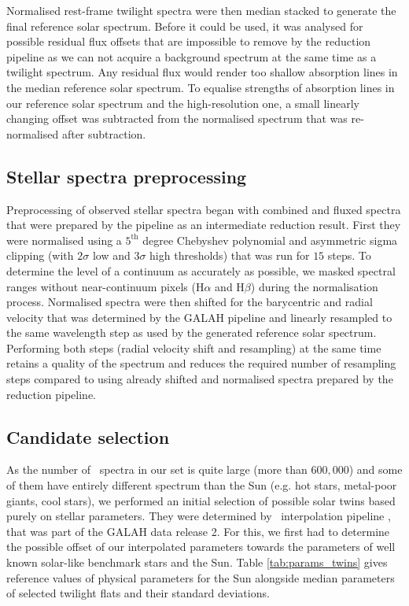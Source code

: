 Normalised rest-frame twilight spectra were then median stacked to generate the final reference solar spectrum. Before it could be used, it was analysed for possible residual flux offsets that are impossible to remove by the reduction pipeline as we can not acquire a background spectrum at the same time as a twilight spectrum. Any residual flux would render too shallow absorption lines in the median reference solar spectrum. To equalise strengths of absorption lines in our reference solar spectrum and the high-resolution one, a small linearly changing offset was subtracted from the normalised spectrum that was re-normalised after subtraction. 

\subsection{Stellar spectra preprocessing}
\label{sec:05_preprocessing}
Preprocessing of observed stellar spectra began with combined and fluxed spectra that were prepared by the pipeline as an intermediate reduction result. First they were normalised using a $5^\text{th}$ degree Chebyshev polynomial and asymmetric sigma clipping (with $2\sigma$ low and $3\sigma$ high thresholds) that was run for $15$ steps. To determine the level of a continuum as accurately as possible, we masked spectral ranges without near-continuum pixels (H$\alpha$ and H$\beta$) during the normalisation process. Normalised spectra were then shifted for the barycentric and radial velocity that was determined by the GALAH pipeline and linearly resampled to the same wavelength step as used by the generated reference solar spectrum. Performing both steps (radial velocity shift and resampling) at the same time retains a quality of the spectrum and reduces the required number of resampling steps compared to using already shifted and normalised spectra prepared by the reduction pipeline.

\subsection{Candidate selection}
\label{sec:05_candidates}
As the number of \Gh\ spectra in our set is quite large (more than $600,000$) and some of them have entirely different spectrum than the Sun (e.g. hot stars, metal-poor giants, cool stars), we performed an initial selection of possible solar twins based purely on stellar parameters. They were determined by \TC\ interpolation pipeline \cite{buder2018}, that was part of the GALAH data release 2. For this, we first had to determine the possible offset of our interpolated parameters towards the parameters of well known solar-like benchmark stars \cite{2014A&A...564A.133J, 2015A&A...582A..49H} and the Sun. Table \ref{tab:params_twins} gives reference values of physical parameters for the Sun alongside median parameters of selected twilight flats and their standard deviations. 


